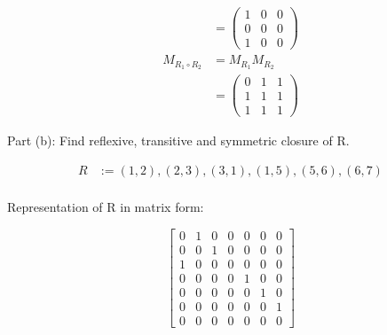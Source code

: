\documentclass{article}
\begin{document}
\[\begin{aligned}
                                                                                & = \begin{pmatrix}1&0&0\\0&0&0\\1&0&0\end{pmatrix}                                            \\
               M_{R_1 \circ R_2}                                                & = M_{R_1}M_{R_2}                                                                                            \\
                                                                                & = \begin{pmatrix}0&1&1\\1&1&1\\1&1&1\end{pmatrix}
    \end{aligned}
\]

Part (b): Find reflexive, transitive and symmetric closure of R.

\[\begin{aligned}
        R & := { (1,2), (2,3), (3,1), (1,5), (5,6), (6,7) } \\
    \end{aligned}\]

Representation of R in matrix form:

\[
    \begin{bmatrix}
        0 & 1 & 0 & 0 & 0 & 0 & 0 \\
        0 & 0 & 1 & 0 & 0 & 0 & 0 \\
        1 & 0 & 0 & 0 & 0 & 0 & 0 \\
        0 & 0 & 0 & 0 & 1 & 0 & 0 \\
        0 & 0 & 0 & 0 & 0 & 1 & 0 \\
        0 & 0 & 0 & 0 & 0 & 0 & 1 \\
        0 & 0 & 0 & 0 & 0 & 0 & 0
    \end{bmatrix}
\]
\end{document}
